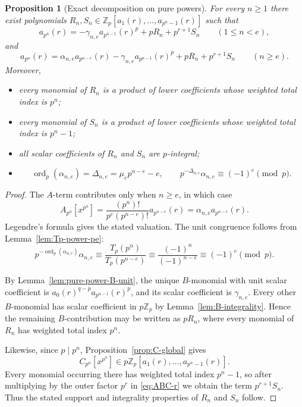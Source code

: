 \documentclass[11pt]{amsart}
\numberwithin{equation}{section}
\newtheorem{proposition}[proposition]{Proposition}
\DeclareMathOperator{\ordop}{ord}
\newcommand{\Zp}{\mathbb{Z}_p}
\newcommand{\Tp}{T_p}
\newcommand{\vp}{\ordop_p}
\begin{document}
\begin{proposition}[Exact decomposition on pure powers]\label{prop:pure-decomp}
For every $n\ge1$ there exist polynomials $R_n,S_n\in\Zp[a_1(r),\ldots,a_{p^n-1}(r)]$ such that
\begin{equation}\label{eq:pure-decomp-small}
        a_{p^n}(r)=-\gamma_{n,e}a_{p^{n-1}}(r)^p+pR_n+p^{r+1}S_n
        \qquad(1\le n<e),
\end{equation}
and
\begin{equation}\label{eq:pure-decomp-large}
        a_{p^n}(r)=\alpha_{n,e}a_{p^{n-e}}(r)-\gamma_{n,e}a_{p^{n-1}}(r)^p+pR_n+p^{r+1}S_n
        \qquad(n\ge e).
\end{equation}
Moreover,
\begin{itemize}[leftmargin=2em]
\item every monomial of $R_n$ is a product of lower coefficients whose weighted total index is $p^n$;
\item every monomial of $S_n$ is a product of lower coefficients whose weighted total index is $p^n-1$;
\item all scalar coefficients of $R_n$ and $S_n$ are $p$-integral;
\item
\[
        \vp(\alpha_{n,e})=\Delta_{n,e}=\mu_ep^{n-e}-e,
        \qquad
        p^{-\Delta_{n,e}}\alpha_{n,e}\equiv(-1)^e\pmod p.
\]
\end{itemize}
\end{proposition}
\begin{proof}
The $A$-term contributes only when $n\ge e$, in which case
\[
        A_{p^n}[x^{p^n}]=\frac{(p^n)!}{p^e(p^{n-e})!}a_{p^{n-e}}(r)=\alpha_{n,e}a_{p^{n-e}}(r).
\]
Legendre's formula gives the stated valuation.  The unit congruence follows from Lemma~\ref{lem:Tp-power-pe}:
\[
        p^{-\vp(\alpha_{n,e})}\alpha_{n,e}
        \equiv \frac{\Tp(p^n)}{\Tp(p^{n-e})}
        \equiv \frac{(-1)^n}{(-1)^{n-e}}
        \equiv (-1)^e\pmod p.
\]

By Lemma~\ref{lem:pure-power-B-unit}, the unique $B$-monomial with unit scalar coefficient is $a_0(r)^{q-p}a_{p^{n-1}}(r)^p$, and its scalar coefficient is $\gamma_{n,e}$.  Every other $B$-monomial has scalar coefficient in $p\Zp$ by Lemma~\ref{lem:B-integrality}.  Hence the remaining $B$-contribution may be written as $pR_n$, where every monomial of $R_n$ has weighted total index $p^n$.

Likewise, since $p\mid p^n$, Proposition~\ref{prop:C-global} gives
\[
        C_{p^n}[x^{p^n}]\in p\Zp[a_1(r),\ldots,a_{p^n-1}(r)].
\]
Every monomial occurring there has weighted total index $p^n-1$, so after multiplying by the outer factor $p^r$ in \eqref{eq:ABC-r} we obtain the term $p^{r+1}S_n$.  Thus the stated support and integrality properties of $R_n$ and $S_n$ follow.
\end{proof}
\end{document}
